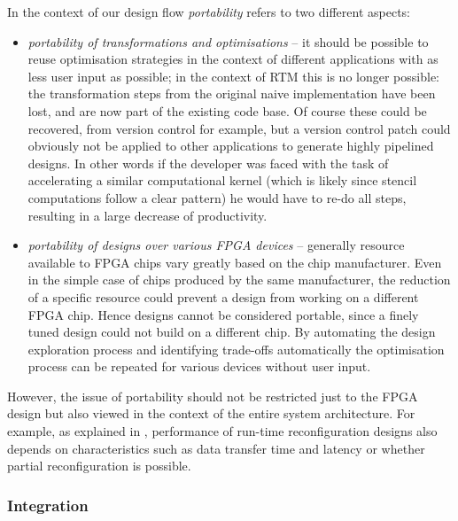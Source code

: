 In the context of our design flow \emph{portability} refers to two
different aspects:
\begin{itemize}
\item \emph{portability of transformations and optimisations} -- it
  should be possible to reuse optimisation strategies in the context
  of different applications with as less user input as possible; in
  the context of RTM this is no longer possible: the transformation
  steps from the original naive implementation have been lost, and are
  now part of the existing code base. Of course these could be
  recovered, from version control for example, but a version control
  patch could obviously not be applied to other applications to
  generate highly pipelined designs. In other words if the developer
  was faced with the task of accelerating a similar computational
  kernel (which is likely since stencil computations follow a clear
  pattern) he would have to re-do all steps, resulting in a large
  decrease of productivity.

\item \emph{portability of designs over various FPGA devices} --
  generally resource available to FPGA chips vary greatly based on the
  chip manufacturer. Even in the simple case of chips produced by the
  same manufacturer, the reduction of a specific resource could
  prevent a design from working on a different FPGA chip. Hence
  designs cannot be considered portable, since a finely tuned design
  could not build on a different chip. By automating the design
  exploration process and identifying trade-offs automatically the
  optimisation process can be repeated for various devices without
  user input.
\end{itemize}

However, the issue of portability should not be restricted just to the
FPGA design but also viewed in the context of the entire system
architecture. For example, as explained in
, performance of run-time
reconfiguration designs also depends on characteristics such as data
transfer time and latency or whether partial reconfiguration is
possible.



\subsubsection{Integration}

